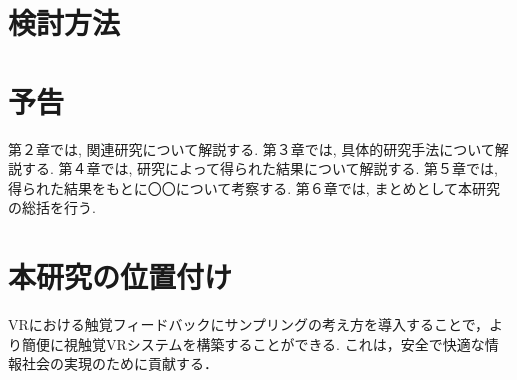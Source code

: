 \section{検討方法}

\section{予告}
第２章では, 関連研究について解説する.
第３章では, 具体的研究手法について解説する.
第４章では, 研究によって得られた結果について解説する.
第５章では, 得られた結果をもとに〇〇について考察する.
第６章では, まとめとして本研究の総括を行う.

\section{本研究の位置付け}
VRにおける触覚フィードバックにサンプリングの考え方を導入することで，より簡便に視触覚VRシステムを構築することができる.
これは，安全で快適な情報社会の実現のために貢献する．